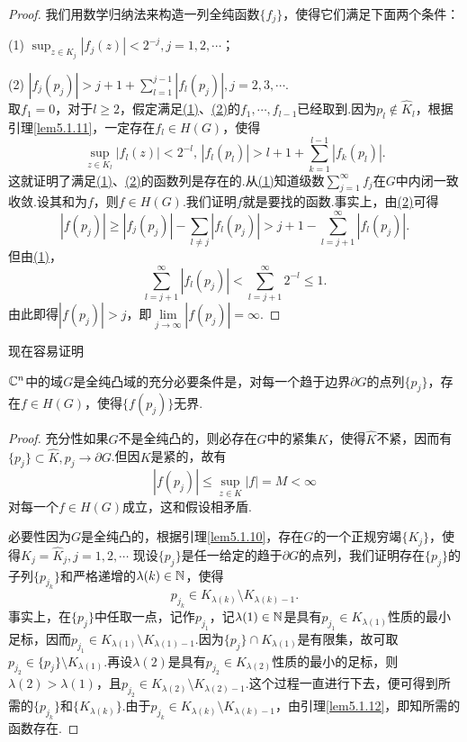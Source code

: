 \begin{proof}
	我们用数学归纳法来构造一列全纯函数$\{f_j\}$，使得它们满足下面两个条件：
	
	(1)\hypertarget{5.1.12}{}
	$\sup_{z\in K_j}|f_j(z)|<2^{-j},j=1,2,\cdots$；
	
	(2)\hypertarget{5.1.12}{}
	$|f_j(p_j)|>j+1+\sum\limits_{l=1}^{j-1}|f_l(p_j)|,j=2,3,\cdots$.\\
取$f_1=0$，对于$l\ge2$，假定满足\hyperlink{5.1.12}{(1)}、\hyperlink{5.1.12}{(2)}的$f_1,\cdots,f_{l-1}$已经取到.因为$p_l\notin\widehat{K}_l$，根据引理\ref{lem5.1.11}，一定存在$f_l\in H(G)$，使得
\[\sup_{z\in K_l}|f_l(z)|<2^{-l},\,|f_l(p_l)|>l+1+\sum_{k=1}^{l-1}|f_k(p_l)|.\]
这就证明了满足\hyperlink{5.1.12}{(1)}、\hyperlink{5.1.12}{(2)}的函数列是存在的.从\hyperlink{5.1.12}{(1)}知道级数$\sum\limits_{j=1}^\infty f_j$在$G$中内闭一致收敛.设其和为$f$，则$f\in H(G)$.我们证明$f$就是要找的函数.事实上，由\hyperlink{5.1.12}{(2)}可得
\[|f(p_j)|\ge |f_j(p_j)|-\sum_{l\neq j}|f_l(p_j)|>j+1-\sum_{l=j+1}^\infty |f_l(p_j)|.\]
但由\hyperlink{5.1.12}{(1)}，
\[\sum_{l=j+1}^{\infty}|f_l(p_j)|<\sum_{l=j+1}^{\infty}2^{-l}\le1.\]
由此即得$|f(p_j)|>j$，即$\lim\limits_{j\to\infty}|f(p_j)|=\infty$.
\end{proof}
现在容易证明
\begin{theorem}\label{thm5.1.13}
	$\mathbb C^n$中的域$G$是全纯凸域的充分必要条件是，对每一个趋于边界$\partial G$的点列$\{p_j\}$，存在$f\in H(G)$，使得$\{f(p_j)\}$无界.
\end{theorem}
\begin{proof}
	充分性\quad 如果$G$不是全纯凸的，则必存在$G$中的紧集$K$，使得$\widehat{K}$不紧，因而有$\{p_j\}\subset\widehat{K},p_j\to\partial G$.但因$K$是紧的，故有
	\[|f(p_j)|\le\sup_{z\in K}|f|=M<\infty\]
	对每一个$f\in H(G)$成立，这和假设相矛盾.
	
	必要性\quad 因为$G$是全纯凸的，根据引理\ref{lem5.1.10}，存在$G$的一个正规穷竭$\{K_j\}$，使得$K_j=\widehat{K}_j,j=1,2,\cdots$ 现设$\{p_j\}$是任一给定的趋于$\partial G$的点列，我们证明存在$\{p_j\}$的子列$\{p_{j_k}\}$和严格递增的$\lambda(k)\in\mathbb N$，使得
	\[p_{j_k}\in K_{\lambda(k)}\setminus K_{\lambda(k)-1}.\]
	事实上，在$\{p_j\}$中任取一点，记作$p_{j_1}$，记$\lambda(1)\in\mathbb N$是具有$p_{j_1}\in K_{\lambda(1)}$性质的最小足标，因而$p_{j_1}\in K_{\lambda(1)}\setminus K_{\lambda(1)-1}$.因为$\{p_j\}\cap K_{\lambda(1)}$是有限集，故可取$p_{j_2}\in\{p_j\}\setminus K_{\lambda(1)}$.再设$\lambda(2)$是具有$p_{j_2}\in K_{\lambda(2)}$性质的最小的足标，则$\lambda(2)>\lambda(1)$，且$p_{j_2}\in K_{\lambda(2)}\setminus K_{\lambda(2)-1}$.这个过程一直进行下去，便可得到所需的$\{p_{j_k}\}$和$\{K_{\lambda(k)}\}$.由于$p_{j_k}\in K_{\lambda(k)}\setminus K_{\lambda(k)-1}$，由引理\ref{lem5.1.12}，即知所需的函数存在.
\end{proof}
